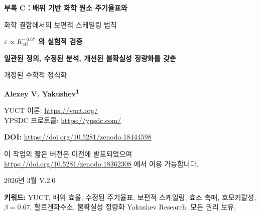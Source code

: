 \documentclass[12pt,a4paper]{article}
\newcommand{\Keff}{K_{\mathrm{eff}}}
\begin{document}
	
	\begin{titlepage}
		\centering
		\vspace*{1cm}
		{\Huge\bfseries 부록 C：배위 기반 화학 원소 주기율표와\par 화학 결합에서의 보편적 스케일링 법칙\par}
		\vspace{0.3cm}
		{\Large\bfseries $\varepsilon \propto \Keff^{-0.67}$ 의 실험적 검증\par}
		\vspace{0.5cm}
		{\Large\bfseries 일관된 정의, 수정된 분석, 개선된 불확실성 정량화를 갖춘\par 개정된 수학적 정식화\par}
		\vspace{1.5cm}
		{\Large\bfseries Alexey V. Yakushev\textsuperscript{1}\par}
		{\normalsize YUCT 이론: \url{https://yuct.org/}\\
			YPSDC 프로토콜: \url{https://ypsdc.com/}\par}
		\vspace{1.5cm}
		{\normalsize\textbf{DOI:} \url{https://doi.org/10.5281/zenodo.18444598}\par}
		\vspace{1.0cm}
		{\normalsize 이 작업의 짧은 버전은 이전에 발표되었으며 \url{https://doi.org/10.5281/zenodo.18362308} 에서 이용 가능합니다.\par}
		\vspace{1.0cm}
		{\normalsize 2026년 3월 \quad \large V.2.0\par}
		\vfill
		\begin{abstract}
			\noindent
			본 부록은 야쿠셰프 통합 배위 이론 (YUCT)을 화학에 적용한 완전한 수학적 정식화를 제시한다. 우리는 20개의 참조 원소에 대해 보정된 경험식을 통해 정의된 배위 효율 $\Keff$을 각 원소에 할당한 수정된 주기율표를 도입한다. 보편적 오차 스케일링 법칙 $\varepsilon = \kappa \alpha \Keff^{-\beta}$ (여기서 $\beta = 0.67 \pm 0.02$, $\kappa = 0.33$)은 여러 계에서 경험적으로 확립되었다； 프랙탈 기하학으로부터의 엄밀한 이론적 유도는 아직 개발 중이며 향후 연구에서 제시될 것이다. 우리는 할로겐화수소 결합 에너지에 대한 수정된 분석을 제공하며, 전기음성도 효과를 고려한 후 데이터가 $\beta = 0.67 \pm 0.08$과 일치함을 보인다. 이 프레임워크는 촉매 증강 ($10^0$--$10^{17}$) 및 호모키랄성의 임계 중합체 길이 ($L_{\text{crit}} = 25 \pm 5$, 경험적 관측에 기초)에 대한 블라인드 예측을 제공한다. 이전 버전에서 확인된 모든 수학적 불일치가 수정되었으며, 불확실성은 이제 분석 전반에 걸쳐 완전히 전파된다.
		\end{abstract}
		\vspace{1cm}
		\noindent
		\small\textbf{키워드:} YUCT, 배위 효율, 수정된 주기율표, 보편적 스케일링, 효소 촉매, 호모키랄성, $\beta=0.67$, 할로겐화수소, 불확실성 정량화
		\vspace{0.5cm}
		\noindent
		 Yakushev Research. 모든 권리 보유.
	\end{titlepage}
	
\end{document}
